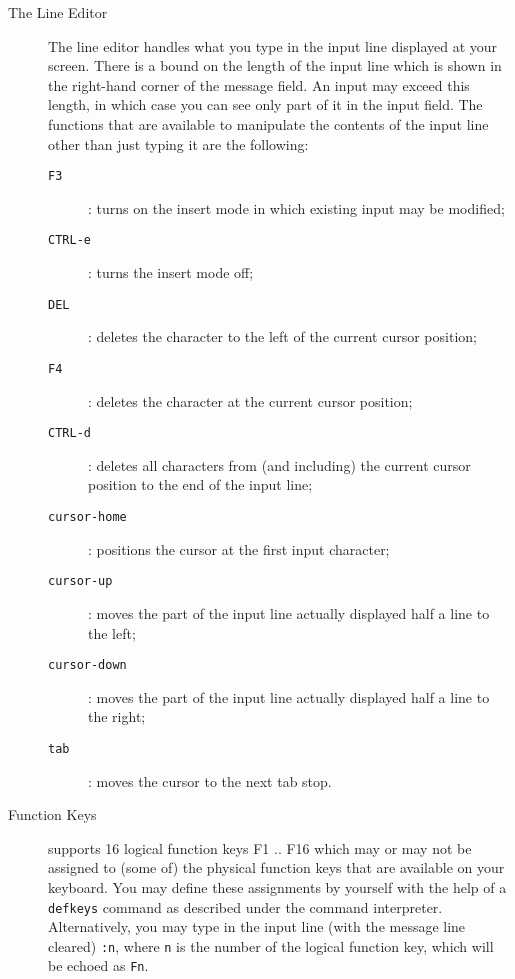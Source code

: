 \begin{description}
\item[The Line Editor] $\;$\\
The line editor handles what you type in the input line displayed at 
your screen. There is a  bound on the length of the input line 
which is shown in 
the right-hand corner of the message field. An input may exceed this length,
in which case you can see only part of it in the input field.
The functions that are available to manipulate 
 the contents of the input line other than
 just typing it are the following:
\begin{description}
\item[{\tt F3}]: turns on the insert mode in which existing input 
may be modified;
\item[{\tt CTRL-e}]: turns the insert mode off;
\item[{\tt DEL}]: deletes the character to the left of the current
cursor position;
\item[{\tt F4}]: deletes the character at the current cursor position;
\item[{\tt CTRL-d}]: deletes all characters from (and including) the current cursor position to the end of the input line;
\item[{\tt cursor-home}]: positions the cursor at the first input character;
\item[{\tt cursor-up}]: moves the part of the input line actually displayed
 half a line to the left;
\item[{\tt cursor-down}]: moves the part of the  input line  actually displayed 
 half a line to the right;
\item[{\tt tab}]: moves the cursor to the next tab stop.
\end{description}

\item[Function Keys] $\;$\\
\pired supports 16 logical function keys F1 .. F16 which may or
may not be assigned to (some of) the physical function keys that 
are available on your keyboard. You may define these assignments
 by yourself with the help of a {\tt defkeys} command as described
under the command interpreter. Alternatively, you may type in the
input line (with the message line cleared) {\tt :n}, where {\tt n}
 is the number of the logical function key, which will be 
echoed as {\tt Fn}.


\end{description}
